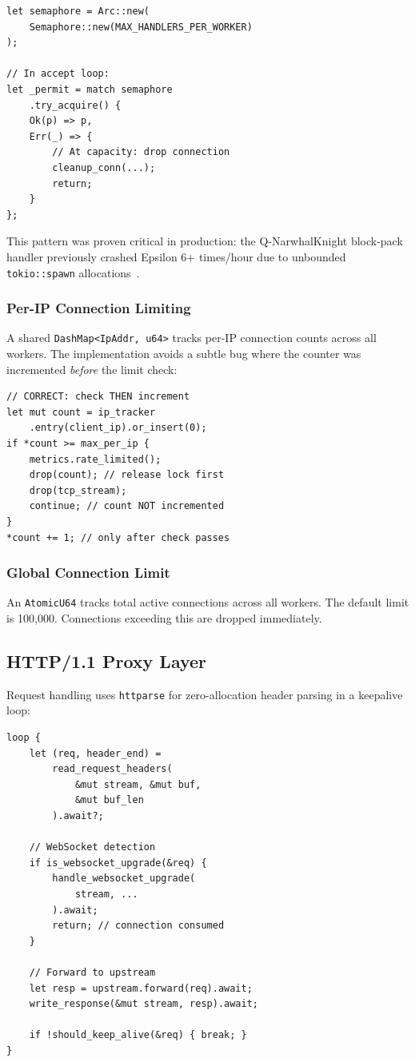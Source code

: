 \documentclass[11pt,a4paper,twocolumn]{article}
\begin{document}
\begin{lstlisting}
let semaphore = Arc::new(
    Semaphore::new(MAX_HANDLERS_PER_WORKER)
);

// In accept loop:
let _permit = match semaphore
    .try_acquire() {
    Ok(p) => p,
    Err(_) => {
        // At capacity: drop connection
        cleanup_conn(...);
        return;
    }
};
\end{lstlisting}

This pattern was proven critical in production: the Q-NarwhalKnight block-pack handler previously crashed Epsilon 6+ times/hour due to unbounded \texttt{tokio::spawn} allocations~\cite{block-pack-oom}.

\subsubsection{Per-IP Connection Limiting}

A shared \texttt{DashMap<IpAddr, u64>} tracks per-IP connection counts across all workers. The implementation avoids a subtle bug where the counter was incremented \textit{before} the limit check:

\begin{lstlisting}
// CORRECT: check THEN increment
let mut count = ip_tracker
    .entry(client_ip).or_insert(0);
if *count >= max_per_ip {
    metrics.rate_limited();
    drop(count); // release lock first
    drop(tcp_stream);
    continue; // count NOT incremented
}
*count += 1; // only after check passes
\end{lstlisting}

\subsubsection{Global Connection Limit}

An \texttt{AtomicU64} tracks total active connections across all workers. The default limit is 100,000. Connections exceeding this are dropped immediately.

\subsection{HTTP/1.1 Proxy Layer}

Request handling uses \texttt{httparse} for zero-allocation header parsing in a keepalive loop:

\begin{lstlisting}
loop {
    let (req, header_end) =
        read_request_headers(
            &mut stream, &mut buf,
            &mut buf_len
        ).await?;

    // WebSocket detection
    if is_websocket_upgrade(&req) {
        handle_websocket_upgrade(
            stream, ...
        ).await;
        return; // connection consumed
    }

    // Forward to upstream
    let resp = upstream.forward(req).await;
    write_response(&mut stream, resp).await;

    if !should_keep_alive(&req) { break; }
}
\end{lstlisting}
\end{document}
